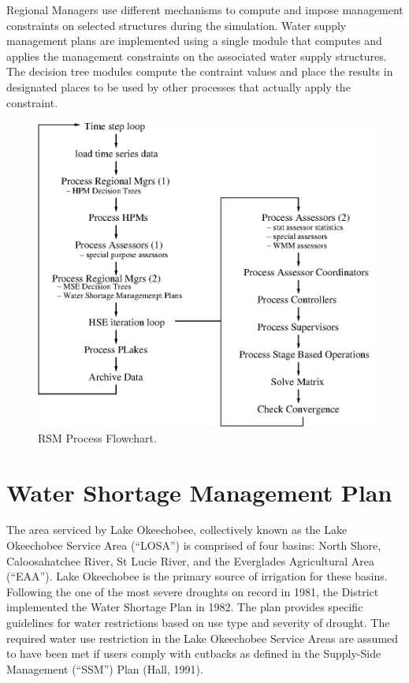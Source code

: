 Regional Managers use different mechanisms to compute and impose
management constraints on selected structures during the
simulation. Water supply management plans are implemented using a
single module that computes and applies the management constraints on
the associated water supply structures. The decision tree modules
compute the contraint values and place the results in designated
places to be used by other processes that actually apply the
constraint.

\begin{figure}
 \begin{center}
  \includegraphics[scale=.8]{Graphics/regMngrFlowchart.eps}
 \end{center}
 \caption{\label{rsmFlowchart} RSM Process Flowchart.}        
\end{figure}

\section{Water Shortage Management Plan}

The area serviced by Lake Okeechobee, collectively known as the Lake
Okeechobee Service Area (``LOSA'') is comprised of four basins: North
Shore, Caloosahatchee River, St Lucie River, and the Everglades
Agricultural Area (``EAA'').  Lake Okeechobee is the primary source of
irrigation for these basins.  Following the one of the most severe
droughts on record in 1981, the District implemented the Water
Shortage Plan in 1982.  The plan provides specific guidelines for
water restrictions based on use type and severity of drought.  The
required water use restriction in the Lake Okeechobee Service Areas
are assumed to have been met if users comply with cutbacks as defined
in the Supply-Side Management (``SSM'') Plan (Hall, 1991).  

